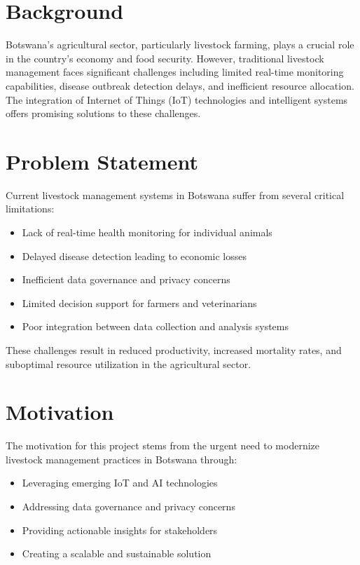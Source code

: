 
\section{Background}

Botswana's agricultural sector, particularly livestock farming, plays a crucial role in the country's economy and food security. However, traditional livestock management faces significant challenges including limited real-time monitoring capabilities, disease outbreak detection delays, and inefficient resource allocation. The integration of Internet of Things (IoT) technologies and intelligent systems offers promising solutions to these challenges.

\section{Problem Statement}

Current livestock management systems in Botswana suffer from several critical limitations:

\begin{itemize}
    \item Lack of real-time health monitoring for individual animals
    \item Delayed disease detection leading to economic losses
    \item Inefficient data governance and privacy concerns
    \item Limited decision support for farmers and veterinarians
    \item Poor integration between data collection and analysis systems
\end{itemize}

These challenges result in reduced productivity, increased mortality rates, and suboptimal resource utilization in the agricultural sector.

\section{Motivation}

The motivation for this project stems from the urgent need to modernize livestock management practices in Botswana through:

\begin{itemize}
    \item Leveraging emerging IoT and AI technologies
    \item Addressing data governance and privacy concerns
    \item Providing actionable insights for stakeholders
    \item Creating a scalable and sustainable solution
\end{itemize}

